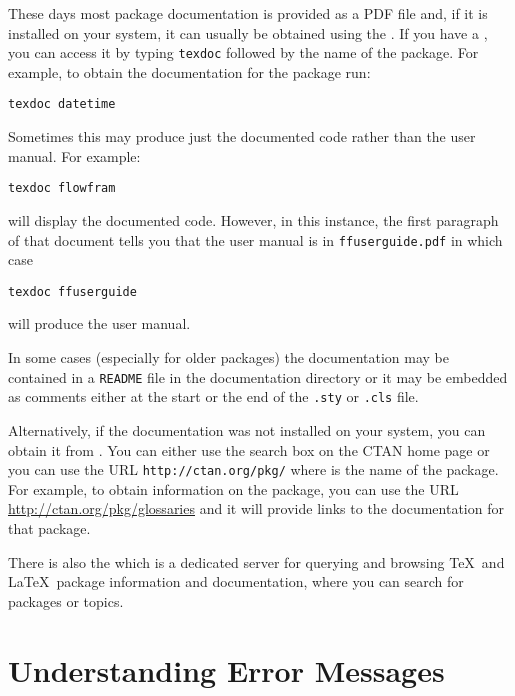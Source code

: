 These days most package documentation is provided as a PDF file and,
if it is installed on your system, it can usually be obtained using
the . 
If you have a ,
you can access it by typing \texttt{texdoc} followed by the name of the
package. For example, to obtain the documentation for the
 package run: 
\begin{verbatim}
texdoc datetime
\end{verbatim}
Sometimes this may produce just the documented code rather than the
user manual. For example:
\begin{verbatim}
texdoc flowfram
\end{verbatim}
will display the documented code. However, in this instance, the
first paragraph of that document tells you that the user manual is
in \texttt{ffuserguide.pdf} in which case
\begin{verbatim}
texdoc ffuserguide
\end{verbatim}
will produce the user manual.

In some cases (especially for older packages) the documentation may
be contained in a \texttt{README} file in the documentation directory or it
may be embedded as comments either at the start or the end of the
\texttt{.sty} or \texttt{.cls} file. 

Alternatively, if the documentation was not installed on your system,
you can obtain it from .
You can either use the search box on the CTAN home page or you can use the URL
\texttt{http://ctan.org/pkg/} where  is the name of the package.
For example, to obtain information on the  package, you
can use the URL \url{http://ctan.org/pkg/glossaries} and it will
provide links to the documentation for that package. 

There is also the  which is a dedicated server for
querying and browsing \TeX\ and \LaTeX\ package information and
documentation, where you can search for packages or topics.

\section{Understanding Error Messages}
\label{sec:errormessages}

